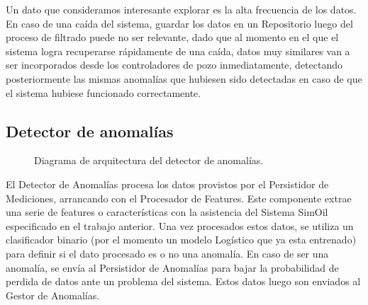 \documentclass{article}
\theoremstyle{definition}
\theoremstyle{remark}
\begin{document}
Un dato que consideramos interesante explorar es la alta frecuencia de los datos. En caso de una caída del sistema, guardar los datos en un Repositorio luego del proceso de filtrado puede no ser relevante, dado que al momento en el que el sistema logra recuperarse rápidamente de una caída, datos muy similares van a ser incorporados desde los controladores de pozo inmediatamente, detectando posteriormente las mismas anomalías que hubiesen sido detectadas en caso de que el sistema hubiese funcionado correctamente.

\subsection{Detector de anomalías} \label{detector_anomalias}

\begin{figure}[H]
  \caption{Diagrama de arquitectura del detector de anomalías.}
\end{figure}

El Detector de Anomalías procesa los datos provistos por el Persistidor de Mediciones, arrancando con el Procesador de Features. Este componente extrae una serie de features o características con la asistencia del Sistema SimOil especificado en el trabajo anterior. Una vez procesados estos datos, se utiliza un clasificador binario (por el momento un modelo Logístico que ya esta entrenado) para definir si el dato procesado es o no una anomalía. En caso de ser una anomalía, se envía al Persistidor de Anomalías para bajar la probabilidad de perdida de datos ante un problema del sistema. Estos datos luego son enviados al Gestor de Anomalías.
\end{document}
